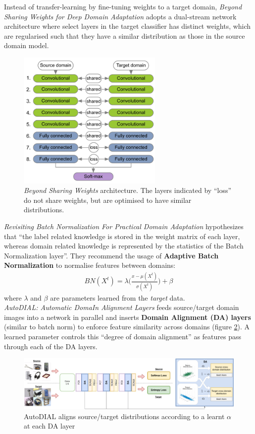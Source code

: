\documentclass{report}
\begin{document}
Instead of transfer-learning by fine-tuning weights to a target domain, \textit{Beyond Sharing Weights for Deep Domain Adaptation}\parencite{beyondsharing} adopts a dual-stream network architecture where select layers in the target classifier has distinct weights, which are regularised such that they have a similar distribution as those in the source domain model. \\
\begin{figure}[h]
	\centering
	\includegraphics[width=7cm]{imgs/beyondsharing}
	\caption{\textit{Beyond Sharing Weights} architecture. The layers indicated by ``loss'' do not share weights, but are optimised to have similar distributions.}
	\label{fig:beyondsharing}
\end{figure}

\textit{Revisiting Batch Normalization For Practical Domain Adaptation}\parencite{revisitingbatchnorm} hypothesizes that ``the label related knowledge is stored in the weight matrix of each layer, whereas domain related knowledge is represented by the statistics of the Batch Normalization layer''. They  recommend the usage of \textbf{Adaptive Batch Normalization} to normalise features between domains:
\begin{align}
	BN(X^t) = \lambda\bigg(\frac{x-\mu(X^t)}{\sigma(X^t)}\bigg)+\beta
\end{align}
where $\lambda$ and $\beta$ are parameters learned from the \textit{target} data. \\

\textit{AutoDIAL: Automatic DomaIn Alignment Layers}\parencite{autodial} feeds source/target domain images into a network in parallel and inserts \textbf{Domain Alignment (DA) layers} (similar to batch norm) to enforce feature similarity across domains (figure \ref{fig:autodial}). A learned parameter controls this ``degree of domain alignment'' as features pass through each of the DA layers. \\
\begin{figure}[h]
	\centering
	\includegraphics[width=17cm]{imgs/autodial}
	\caption{AutoDIAL aligns source/target distributions according to a learnt $\alpha$ at each DA layer}
	\label{fig:autodial}
\end{figure}
\end{document}
